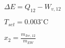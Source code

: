 \( \Delta E = Q_{12} - W_{v,12} \)  

\( T_{set} = 0.003^\circ \text{C} \)  

\( x_2 = \frac{m_{Ice,12}}{m_{EW}} \)